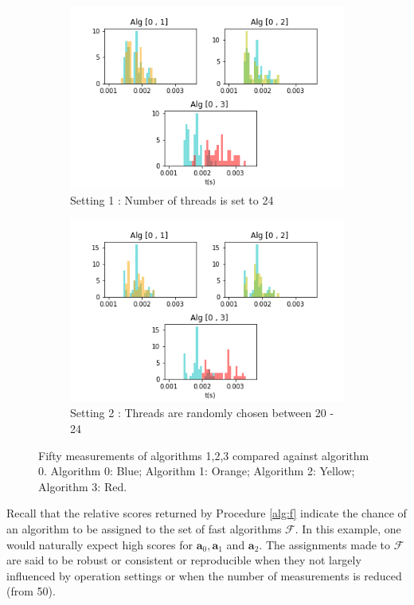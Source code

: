 \documentclass[conference]{IEEEtran}
\begin{document}
\begin{figure}
	\centering
	\begin{subfigure}[b]{0.5\textwidth}
		\includegraphics[width=1\linewidth]{fig/f_noise2}
		\caption{Setting 1 : Number of threads is set to 24}
		\label{fig:Ng1}
	\end{subfigure}
	
	\begin{subfigure}[b]{0.5\textwidth}
		\includegraphics[width=1\linewidth]{fig/f2}
		\caption{Setting 2 : Threads are randomly chosen between 20 - 24}
		\label{fig:Ng2} 
	\end{subfigure}
	\caption{Fifty measurements of algorithms 1,2,3 compared against algorithm 0.  Algorithm 0: Blue;  Algorithm 1: Orange; Algorithm 2: Yellow; Algorithm 3: Red.}
	\label{fig:d}
\end{figure}

Recall that the relative scores returned by Procedure \ref{alg:f} indicate the chance of an algorithm to be
assigned to the set of fast algorithms $\mathcal{F}$. In this example, one would naturally expect high scores for
$\mathbf{a}_0, \mathbf{a}_1$ and $\mathbf{a}_2$. The assignments made to $\mathcal{F}$ are said to be robust or
consistent or reproducible when they not largely influenced by operation settings or when the number of measurements is reduced (from 50).
\end{document}
